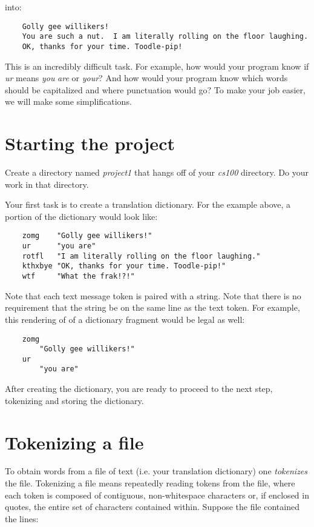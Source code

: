 \documentclass[12pt]{article}
\begin{document}
into:

\begin{verbatim}
    Golly gee willikers!
    You are such a nut.  I am literally rolling on the floor laughing.
    OK, thanks for your time. Toodle-pip!
\end{verbatim}

This is an incredibly difficult task. For example, how would
your program know if {\it ur} means {\it you} {\it are} or {\it your}? 
And how would your program know which words should be capitalized
and where punctuation would go?
To make your job easier, we will make some simplifications.

\section*{Starting the project}

Create a directory named {\it project1} that hangs off of your 
{\it cs100} directory. Do your work in that directory.

Your first task is to create a translation dictionary. For the example
above, a portion of the dictionary would look like:

\begin{verbatim}
    zomg    "Golly gee willikers!"
    ur      "you are"
    rotfl   "I am literally rolling on the floor laughing."
    kthxbye "OK, thanks for your time. Toodle-pip!"
    wtf     "What the frak!?!"
\end{verbatim}

Note that each text message token is paired with a string. Note
that there is no requirement that the string be on the same
line as the text token. For example, this rendering of
of a dictionary fragment would be legal as well:

\begin{verbatim}
    zomg
        "Golly gee willikers!"
    ur
        "you are"
\end{verbatim}

After creating the dictionary, you are ready to proceed to the
next step, tokenizing and storing the dictionary.

\section*{Tokenizing a file}

To obtain words from a file of text (i.e. your translation dictionary)
one {\it tokenizes} the file. Tokenizing a file means repeatedly reading
tokens from the file, where each token is composed of 
contiguous, non-whitespace characters or, if enclosed in quotes,
the entire set of characters contained within.
Suppose the file contained the lines:
\end{document}
